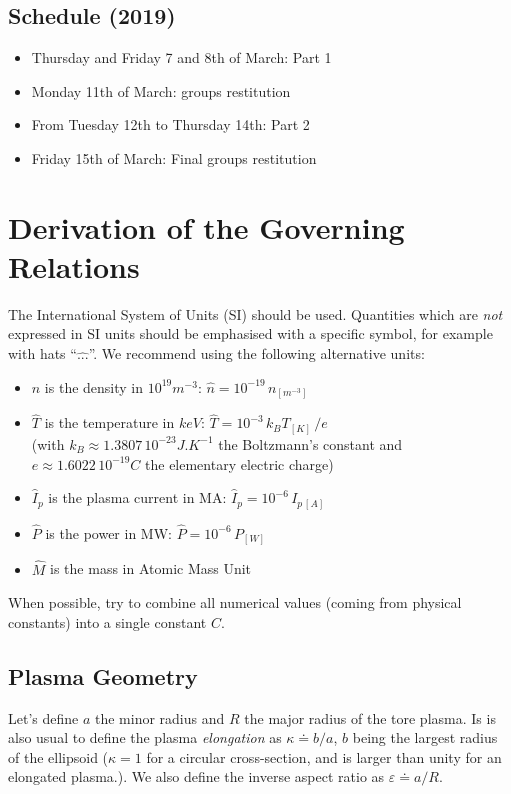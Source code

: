 \subsection{Schedule (2019)}
\begin{itemize}
\item Thursday and Friday 7 and 8th of March: Part 1
\item Monday 11th of March: groups restitution
\item From Tuesday 12th to Thursday 14th: Part 2
\item Friday 15th of March: Final groups restitution
\end{itemize}

\section{Derivation of the Governing Relations}
The International System of Units (SI) should be used. Quantities which are \emph{not} expressed in SI units should be emphasised with a specific symbol, for example with hats ``$\hat{...}$''. We recommend using the following alternative units: 
\begin{itemize}
    \item $\hat n$ is the density in $10^{19} \si{m^{-3}}$: 
    $\hat n = 10^{-19}\,n_{\si{[m^{-3}]}}$
    \item $\hat T$ is the temperature in $keV$: $\hat T = 10^{-3}\, k_B T_{[K]}\,/e$ \\(with $k_B \approx 1.3807\, 10^{-23} \si{J.K^{-1}}$ the Boltzmann's constant and $e\approx 1.6022\, 10^{-19}C$ the elementary electric charge)
    \item $\hat I_p$ is the plasma current in MA: $\hat I_p = 10^{-6}\,I_{p\,[A]}$
    \item $\hat P$ is the power in MW: $\hat P = 10^{-6}\, P_{[W]}$
    \item $\hat M$ is the mass in Atomic Mass Unit
\end{itemize}
When possible, try to combine all numerical values (coming from physical constants) into a single constant $C$.


\subsection{Plasma Geometry}
Let's define $a$ the minor radius and $R$ the major radius of the tore plasma. Is is also usual to define the plasma \textit{elongation} as $\kappa \doteq b/a$, $b$ being the largest radius of the ellipsoid ($\kappa=1$ for a circular cross-section, and is larger than unity for an elongated plasma.). We also define the inverse aspect ratio  as $\varepsilon  \doteq a /R$. 
